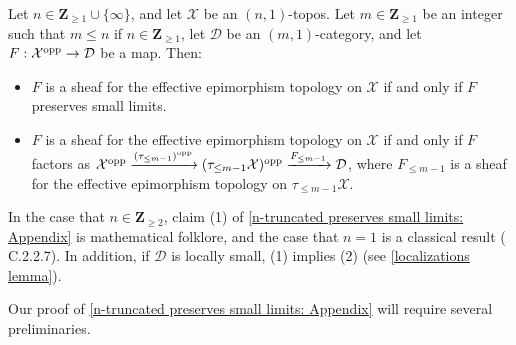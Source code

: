 \documentclass[10pt]{article}
\newcommand{\cD}{\mathcal{D}}
\newcommand{\cX}{\mathcal{X}}
\newcommand{\ZZ}{\mathbb{Z}}
\def\ZZ{{\mathbf Z}}
\theoremstyle{witharg}
\theoremstyle{witharg}
\theoremstyle{witharg2}
\begin{document}
\begin{proposition}{}\label{n-truncated preserves small limits: Appendix}

    Let $n\in \ZZ_{\geq 1}\cup\{\infty\}$, and let $\cX$ be an $(n,1)$-topos. Let $m\in \ZZ_{\geq 1}$ be an integer such that $m \leq n$ if $n\in \ZZ_{\geq 1}$, let $\cD$ be an $(m,1)$-category, and let $F:\cX^{\textnormal{opp}}\rightarrow \cD$ be a map. Then: 

    \begin{itemize}
    
        \item [$(1)$] $F$ is a sheaf for the effective epimorphism topology on $\cX$ if and only if $F$ preserves small limits.

        \item [$(2)$] $F$ is a sheaf for the effective epimorphism topology on $\cX$ if and only if $F$ factors as $\cX^{\textnormal{opp}}\xrightarrow{(\tau_{\leq m-1})^{\textnormal{opp}}}(\tau_{\leq m-1}\cX)^{\textnormal{opp}}\xrightarrow{F_{\leq m-1}}\cD$, where $F_{\leq m-1}$ is a sheaf for the effective epimorphism topology on $\tau_{\leq m-1}\cX$. 
        
    \end{itemize}

\end{proposition}



\begin{remark}{}

    In the case that $n\in \ZZ_{\geq 2}$, claim (1) of \ref{n-truncated preserves small limits: Appendix} is mathematical folklore, and the case that $n=1$ is a classical result ( C.2.2.7). In addition, if $\cD$ is locally small, (1) implies (2) (see \ref{localizations lemma}).

\end{remark}

\noindent Our proof of \ref{n-truncated preserves small limits: Appendix} will require several preliminaries.
\end{document}
